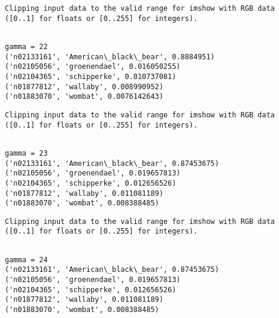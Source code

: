 \documentclass[11pt]{article}
\begin{document}
    \begin{Verbatim}[commandchars=\\\{\}]
Clipping input data to the valid range for imshow with RGB data ([0..1] for floats or [0..255] for integers).

    \end{Verbatim}

    \begin{Verbatim}[commandchars=\\\{\}]

gamma = 22
('n02133161', 'American\_black\_bear', 0.8884951)
('n02105056', 'groenendael', 0.016050255)
('n02104365', 'schipperke', 0.010737081)
('n01877812', 'wallaby', 0.008990952)
('n01883070', 'wombat', 0.0076142643)

    \end{Verbatim}

    \begin{Verbatim}[commandchars=\\\{\}]
Clipping input data to the valid range for imshow with RGB data ([0..1] for floats or [0..255] for integers).

    \end{Verbatim}

    \begin{Verbatim}[commandchars=\\\{\}]

gamma = 23
('n02133161', 'American\_black\_bear', 0.87453675)
('n02105056', 'groenendael', 0.019657813)
('n02104365', 'schipperke', 0.012656526)
('n01877812', 'wallaby', 0.011081189)
('n01883070', 'wombat', 0.008388485)

    \end{Verbatim}

    \begin{Verbatim}[commandchars=\\\{\}]
Clipping input data to the valid range for imshow with RGB data ([0..1] for floats or [0..255] for integers).

    \end{Verbatim}

    \begin{Verbatim}[commandchars=\\\{\}]

gamma = 24
('n02133161', 'American\_black\_bear', 0.87453675)
('n02105056', 'groenendael', 0.019657813)
('n02104365', 'schipperke', 0.012656526)
('n01877812', 'wallaby', 0.011081189)
('n01883070', 'wombat', 0.008388485)

    \end{Verbatim}
\end{document}
